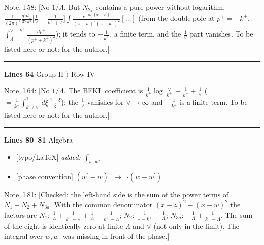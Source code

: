 \documentclass[10pt]{article}
\newenvironment{notebox}{\def\FrameCommand{{\color{notebar}\vrule width 1.5pt}\hspace{6pt}}\MakeFramed{\advance\hsize-\width\FrameRestore}\small}{\endMakeFramed}
\begin{document}
\begin{notebox}\textsf{\small Note, l.58:} [No $1/\Lambda$. But $N_{2f}$ contains a pure power without logarithm, $\frac{1}{(2\pi)^{3}}\frac{g^{4}d_{\perp}}{32\pi^{5}}\big[\frac{1}{\vee}-\frac{1}{k^{+}+\Lambda}\big]\int\frac{e^{-ik\cdot(w-w^\prime)}}{(z-w)^{2}(z-w^\prime)^{2}}[\dots]$ (from the double pole at $p^{+}=-k^{+}$, $\int_{\Lambda}^{\vee-k^{+}}\frac{dp^{+}}{(p^{+}+k^{+})^{2}}$); it tends to $-\frac{1}{k^{+}}$, a finite term, and the $\frac{1}{\vee}$ part vanishes. To be listed here or not: for the author.]\end{notebox}
\noindent\rule{\linewidth}{0.3pt}\par\noindent\textbf{Lines 64} \quad \textsf{Group II $\rangle$ Row IV}\par
\begin{notebox}\textsf{\small Note, l.64:} [No $1/\Lambda$. The BFKL coefficient is $\frac{1}{k^{+}}\log\frac{\vee}{k^{+}}-\frac{1}{k^{+}}+\frac{1}{\vee}$ ($=\frac{1}{k^{+}}\int_{k^{+}/\vee}^{1}d\xi\,\frac{1-\xi}{\xi}$): the $\frac{1}{\vee}$ vanishes for $\vee\to\infty$ and $-\frac{1}{k^{+}}$ is a finite term. To be listed here or not: for the author.]\end{notebox}
\noindent\rule{\linewidth}{0.3pt}\par\noindent\textbf{Lines 80--81} \quad \textsf{Algebra} \par
\begin{itemize}[leftmargin=2.2em,itemsep=1pt,topsep=2pt]
\item[\textbf{l.80}] \textsf{\small [typo/LaTeX]} \emph{added:} $\displaystyle \int_{w,w'}$
\item[\textbf{l.80}] \textsf{\small [phase convention]} $\displaystyle (w^\prime-w)$\ $\longrightarrow$\ $\displaystyle \cdot(w-w^\prime)$
\end{itemize}
\begin{notebox}\textsf{\small Note, l.81:} [Checked: the left-hand side is the sum of the power terms of $N_{1}+N_{2}+N_{3a}$. With the common denominator $(x-z)^{2}-(x-w)^{2}$ the factors are $N_{1}$: $\frac{1}{\Lambda}+\frac{1}{k^{+}-\vee}+\frac{1}{\Lambda}-\frac{1}{k^{+}-\Lambda}$; $N_{2}$: $\frac{1}{\vee-k^{+}}-\frac{1}{\Lambda}$; $N_{3a}$: $-\frac{1}{\Lambda}+\frac{1}{k^{+}-\Lambda}$. The sum of the eight is identically zero at finite $\Lambda$ and $\vee$ (not only in the limit). The integral over $w,w^\prime$ was missing in front of the phase.]\end{notebox}
\bigskip
\end{document}
